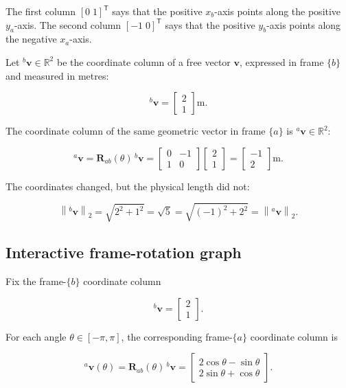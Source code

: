 \documentclass[
  australian,
  12pt,
  letterpaper,
  DIV=11,
  numbers=noendperiod,
  twoside]{scrreprt}
\begin{document}
The first column \([0\;1]^{\mathsf T}\) says that the positive
\(x_b\)-axis points along the positive \(y_a\)-axis. The second column
\([-1\;0]^{\mathsf T}\) says that the positive \(y_b\)-axis points along
the negative \(x_a\)-axis.

Let \({}^{b}\mathbf v\in\mathbb R^2\) be the coordinate column of a free
vector \(\mathbf v\), expressed in frame \(\{b\}\) and measured in
metres:

\[
{}^{b}\mathbf{v}
=
\begin{bmatrix}
2\\
1
\end{bmatrix}
\mathrm{m}.
\]

The coordinate column of the same geometric vector in frame \(\{a\}\) is
\({}^{a}\mathbf v\in\mathbb R^2\):

\[
{}^{a}\mathbf{v}
=
\mathbf{R}_{ab}(\theta)\,{}^{b}\mathbf{v}
=
\begin{bmatrix}
0 & -1\\
1 & 0
\end{bmatrix}
\begin{bmatrix}
2\\
1
\end{bmatrix}
=
\begin{bmatrix}
-1\\
2
\end{bmatrix}
\mathrm{m}.
\]

The coordinates changed, but the physical length did not:

\[
\left\|{}^{b}\mathbf{v}\right\|_2
=
\sqrt{2^2+1^2}
=
\sqrt{5}
=
\sqrt{(-1)^2+2^2}
=
\left\|{}^{a}\mathbf{v}\right\|_2.
\]

\subsection{Interactive frame-rotation
graph}\label{interactive-frame-rotation-graph}

Fix the frame-\(\{b\}\) coordinate column

\[
{}^{b}\mathbf v
=
\begin{bmatrix}
2\\
1
\end{bmatrix}.
\]

For each angle \(\theta\in[-\pi,\pi]\), the corresponding
frame-\(\{a\}\) coordinate column is

\[
{}^{a}\mathbf v(\theta)
=
\mathbf R_{ab}(\theta)\,{}^{b}\mathbf v
=
\begin{bmatrix}
2\cos\theta-\sin\theta\\
2\sin\theta+\cos\theta
\end{bmatrix}.
\]
\end{document}
